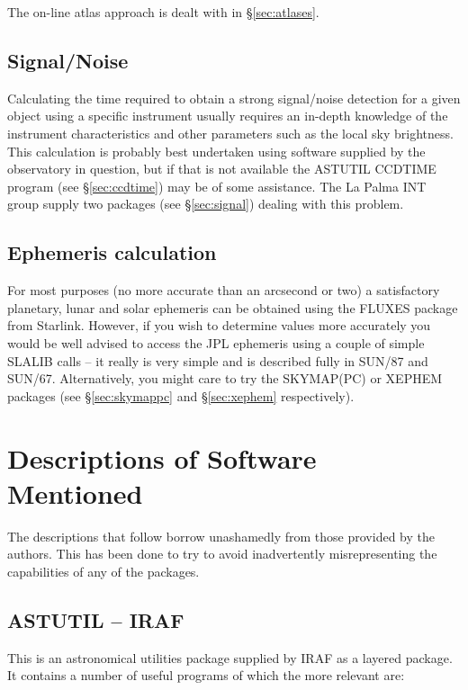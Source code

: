 \documentclass[twoside,11pt]{article}
\newcommand{\htmladdnormallink}[2]{#1}
\newcommand{\xref}[3]{#1}
\newcommand{\xlabel}[1]{}
\newcommand{\IRAFref}{\htmladdnormallink{IRAF}{http://www.starlink.ac.uk/iraf/}}
\newcommand{\SKYMAPPCref}{\htmladdnormallink{SKYMAP(PC)}{http://www.skymap.com}}
\newcommand{\JPLref}{\xref{SUN/87}{sun87}{}}
\newcommand{\SLALIBref}{\xref{SUN/67}{sun67}{}}
\begin{document}
The on-line atlas approach is dealt with in \S{\ref{sec:atlases}}.

\subsection{Signal/Noise} \xlabel{SN}
\label{sec:sn}

Calculating the time required to obtain a strong signal/noise detection
for a given object using a specific instrument usually requires an
in-depth knowledge of the instrument characteristics and other
parameters such as the local sky brightness. This calculation is probably
best undertaken using software supplied by the observatory in question, but
if that is not available the ASTUTIL CCDTIME program (see \S{\ref{sec:ccdtime}})
may be of some assistance. The
La Palma INT group supply two packages (see \S{\ref{sec:signal}}) dealing
with this problem.

\subsection{Ephemeris calculation} \xlabel{EPH}
\label{sec:eph}

For most purposes (no more accurate than an arcsecond or two) a satisfactory
planetary, lunar and solar ephemeris can be obtained using the FLUXES
package from Starlink.
However, if you wish to determine values more accurately you
would be well advised to access the JPL ephemeris using a couple of
simple SLALIB calls -- it really is very simple and is described fully
in {\JPLref} and {\SLALIBref}. Alternatively, you might care to try the {\SKYMAPPCref} or
XEPHEM packages (see \S{\ref{sec:skymappc}} and \S{\ref{sec:xephem}} respectively).

\section{Descriptions of Software Mentioned} \xlabel{DESOFT}
\label{sec:desoft}

The descriptions that follow borrow unashamedly from those provided by
the authors. This has been done to try to avoid inadvertently misrepresenting
the capabilities of any of the packages.

\subsection{ASTUTIL -- IRAF} \xlabel{ASTUTIL}
\label{sec:astutil}

This is an astronomical utilities package supplied by {\IRAFref}
as a layered package. It contains a number of useful programs of which the more
relevant are:
\end{document}
